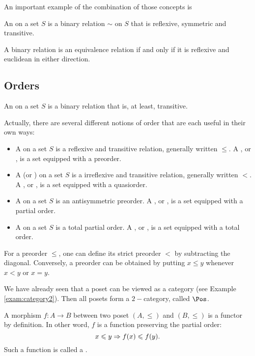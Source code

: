   An important example of the combination of those concepts is
  \begin{defn}
    An  on a set $S$ is a binary relation $\sim$ on $S$ that is reflexive, symmetric and transitive.
  \end{defn}
  \begin{prop}
    A binary relation is an equivalence relation if and only if it is reflexive and euclidean in either direction.
  \end{prop}

\subsection{Orders}
    An  on a set $S$ is a binary relation that is, at least, transitive.

  Actually, there are several different notions of order that are each useful in their own ways:
  \begin{itemize}
    \item A  on a set $S$ is a reflexive and transitive relation, generally written $\leqslant$. A , or , is a set equipped with a preorder.
    \item A  (or ) on a set $S$ is a irreflexive and transitive relation, generally written $<$. A , or , is a set equipped with a quasiorder.
    \item A  on a set $S$ is an antisymmetric preorder. A , or , is a set equipped with a partial order.
    \item A  on a set $S$ is a total partial order. A , or , is a set equipped with a total order.
  \end{itemize}

  For a preorder $\leqslant$, one can define its strict preorder $<$ by subtracting the diagonal. Conversely, a preorder can be obtained by putting $x\leqslant y$ whenever $x<y$ or $x=y$.

  We have already seen that a poset can be viewed as a category (see Example \ref{exam:category2}). Then all posets form a $2-$category, called $\Pos$.

  A morphism $f\colon A\to B$ between two poset $(A,\leqslant)$ and $(B,\leqslant)$ is a functor by definition. In other word, $f$ is a function preserving the partial order:
  \begin{equation*}
    x\leqslant y\Rightarrow f(x)\leqslant f(y).
  \end{equation*}
  Such a function is called a .

